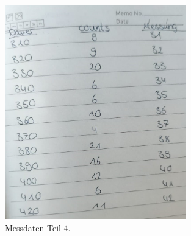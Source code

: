 \begin{figure}
    \centering
    \includegraphics[width=0.7\textwidth]{Bilder/4.jpeg}
    \caption{Messdaten Teil 4.}
    \label{fig:M1}
\end{figure}